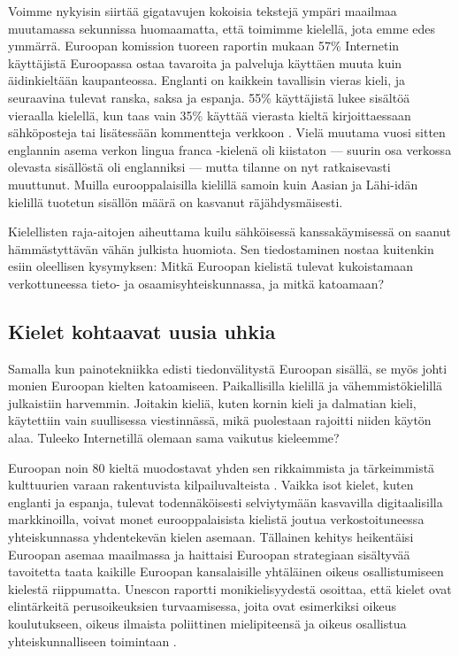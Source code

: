 \begin{multicols}{2}
Voimme nykyisin siirtää gigatavujen kokoisia tekstejä ympäri maailmaa
muutamassa sekunnissa huomaamatta, että toimimme kielellä, jota emme
edes ymmärrä. Euroopan komission tuoreen raportin mukaan 57\%
Internetin käyttäjistä Euroopassa ostaa tavaroita ja palveluja
käyttäen muuta kuin äidinkieltään kaupanteossa. Englanti on kaikkein
tavallisin vieras kieli, ja seuraavina tulevat ranska, saksa ja espanja. 55\%
käyttäjistä lukee sisältöä vieraalla kielellä, kun taas vain 35\%
käyttää vierasta kieltä kirjoittaessaan sähköposteja tai lisätessään
kommentteja verkkoon \cite{EC-prefer}. Vielä muutama vuosi sitten
englannin asema verkon lingua franca -kielenä oli kiistaton — suurin
osa verkossa olevasta sisällöstä oli englanniksi — mutta tilanne on
nyt ratkaisevasti muuttunut. Muilla eurooppalaisilla kielillä samoin
kuin Aasian ja Lähi-idän kielillä tuotetun sisällön määrä on
kasvanut räjähdysmäisesti.

Kielellisten raja-aitojen aiheuttama kuilu sähköisessä kanssakäymisessä  
on saanut hämmästyttävän vähän julkista huomiota. Sen tiedostaminen nostaa kuitenkin
esiin oleellisen kysymyksen: Mitkä Euroopan kielistä  
tulevat kukoistamaan verkottuneessa tieto- ja osaamisyhteiskunnassa, ja mitkä katoamaan?


\subsection{Kielet kohtaavat uusia uhkia}


Samalla kun painotekniikka edisti tiedonvälitystä Euroopan
sisällä, se myös johti monien Euroopan kielten katoamiseen. 
Paikallisilla kielillä ja vähemmistökielillä julkaistiin
harvemmin. Joitakin kieliä, kuten kornin kieli ja dalmatian
kieli, käytettiin vain suullisessa viestinnässä, mikä puolestaan
rajoitti niiden käytön alaa. Tuleeko Internetillä olemaan sama
vaikutus kieleemme?

Euroopan noin 80 kieltä muodostavat yhden sen rikkaimmista ja
tärkeimmistä kulttuurien varaan rakentuvista kilpailuvalteista
\cite{EC-multi}. Vaikka isot kielet, kuten englanti ja espanja, tulevat
todennäköisesti selviytymään kasvavilla digitaalisilla markkinoilla,
voivat monet eurooppalaisista kielistä joutua verkostoituneessa
yhteiskunnassa yhdentekevän kielen asemaan. Tällainen kehitys
heikentäisi Euroopan asemaa maailmassa ja haittaisi Euroopan
strategiaan sisältyvää tavoitetta taata kaikille Euroopan kansalaisille
yhtäläinen oikeus osallistumiseen kielestä riippumatta. 
Unescon raportti monikielisyydestä osoittaa, että kielet
ovat elintärkeitä perusoikeuksien turvaamisessa, joita ovat
esimerkiksi oikeus koulutukseen, oikeus ilmaista poliittinen mielipiteensä 
ja oikeus osallistua yhteiskunnalliseen toimintaan \cite{UN-mid}.



\end{multicols}
